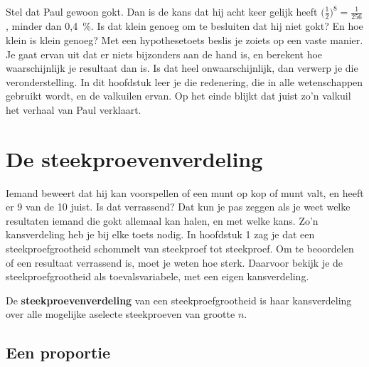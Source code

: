 Stel dat Paul gewoon gokt. Dan is de kans dat hij acht keer gelijk heeft $\bigl(\tfrac12\bigr)^8 = \tfrac{1}{256}$, minder dan 0,4~\%. Is dat klein genoeg om te besluiten dat hij niet gokt? En hoe klein is klein genoeg? Met een hypothesetoets beslis je zoiets op een vaste manier. Je gaat ervan uit dat er niets bijzonders aan de hand is, en berekent hoe waarschijnlijk je resultaat dan is. Is dat heel onwaarschijnlijk, dan verwerp je die veronderstelling. In dit hoofdstuk leer je die redenering, die in alle wetenschappen gebruikt wordt, en de valkuilen ervan. Op het einde blijkt dat juist zo'n valkuil het verhaal van Paul verklaart.

\begin{oefeningen}[Start]

\end{oefeningen}


\section{De steekproevenverdeling}

Iemand beweert dat hij kan voorspellen of een munt op kop of munt valt, en heeft er 9 van de 10 juist. Is dat verrassend? Dat kun je pas zeggen als je weet welke resultaten iemand die gokt allemaal kan halen, en met welke kans. Zo'n kansverdeling heb je bij elke toets nodig. In hoofdstuk 1 zag je dat een steekproefgrootheid schommelt van steekproef tot steekproef. Om te beoordelen of een resultaat verrassend is, moet je weten hoe sterk. Daarvoor bekijk je de steekproefgrootheid als toevalsvariabele, met een eigen kansverdeling.

\begin{theorie}
De \textbf{\textcolor{accent}{steekproevenverdeling}} van een steekproefgrootheid is haar kansverdeling over alle mogelijke aselecte steekproeven van grootte $n$.
\end{theorie}

\subsection{Een proportie}

